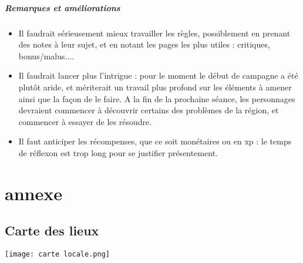 \documentclass[10pt,a4paper]{book}
\begin{document}
\paragraph{Remarques et améliorations}
\begin{itemize}
\item Il faudrait sérieusement mieux travailler les règles, possiblement en prenant des notes à leur sujet, et en notant les pages les plus utiles : critiques, bonus/malus....
\item Il faudrait lancer plus l'intrigue : pour le moment le début de campagne a été plutôt aride, et mériterait un travail plus profond sur les éléments à amener ainsi que la façon de le faire. A la fin de la prochaine séance, les personnages devraient commencer à découvrir certains des problèmes de la région, et commencer à essayer de les résoudre.
\item Il faut anticiper les récompenses, que ce soit monétaires ou en xp : le temps de réflexon est trop long pour se justifier présentement.
\end{itemize}
\chapter*{annexe}
\section{Carte des lieux}
\texttt{[image: carte locale.png]}
\end{document}
